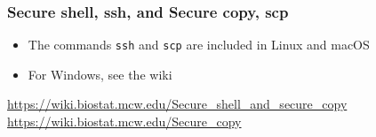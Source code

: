 \documentclass[11pt,pdftex,dvipsnames,usenames,helvetica]{beamer}
\begin{document}
\begin{frame}[fragile]
\frametitle{Secure shell, ssh, and Secure copy, scp}

\begin{itemize}
\item The commands {\tt ssh} and {\tt scp} are included in Linux and macOS
\item For Windows, see the wiki
\end{itemize}
\url{https://wiki.biostat.mcw.edu/Secure_shell_and_secure_copy}\\
\url{https://wiki.biostat.mcw.edu/Secure_copy}
\end{frame}
\begin{comment}
\item x2go provides these commands for Windows from PuTTY\\
as {\tt plink} and {\tt pscp} respectively
\item But you need to have them in your {\tt PATH}
\item Create/edit {\tt AUTOEXEC.BAT} with the following lines
\end{itemize}
{\tt :: this is a comment for the file AUTOEXEC.BAT }\\
{\tt set path=\%path\%C:$\diagdown$Program~Files~(x86)$\diagdown$x2goclient;}
How to run a batch file at startup of Windows 8 and 10?
\begin{enumerate}
\item Create a shortcut to the batch file.
\item Once the shortcut is created, right-click the shortcut file and select Cut.
\item Press Start, type ``run'', and press Enter.
\item In the Run window, type ``shell:startup'' to open the Startup folder.
\item Once the Startup folder is opened, click the Home tab at the top of the folder. Then, select Paste to paste the shortcut file into the Startup folder.
\end{enumerate}
\end{comment}
\end{document}
